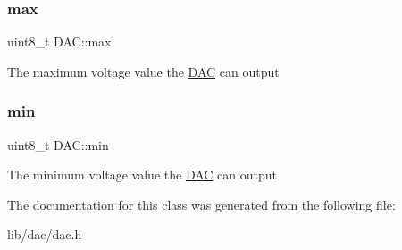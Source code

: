 \subsubsection{\texorpdfstring{max}{max}}
{\footnotesize\ttfamily uint8\+\_\+t D\+A\+C\+::max\hspace{0.3cm}{\ttfamily [private]}}

The maximum voltage value the \hyperlink{class_d_a_c}{D\+AC} can output \hypertarget{class_d_a_c_aa4f21cf166374cfc6edcd412f4d2072b}{}\label{class_d_a_c_aa4f21cf166374cfc6edcd412f4d2072b} 
\subsubsection{\texorpdfstring{min}{min}}
{\footnotesize\ttfamily uint8\+\_\+t D\+A\+C\+::min\hspace{0.3cm}{\ttfamily [private]}}

The minimum voltage value the \hyperlink{class_d_a_c}{D\+AC} can output 

The documentation for this class was generated from the following file\+:\begin{DoxyCompactItemize}
\item 
lib/dac/dac.\+h\end{DoxyCompactItemize}
